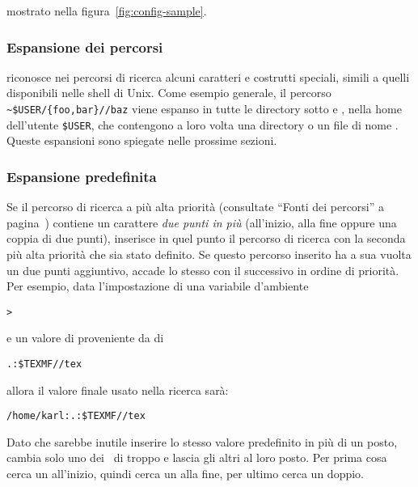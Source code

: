 \documentclass{article}
\begin{document}

\else
mostrato nella figura~\ref{fig:config-sample}.
\fi

\subsubsection{Espansione dei percorsi}
\label{sec:path-expansion}

\KPS{} riconosce nei percorsi di ricerca alcuni caratteri e costrutti
speciali, simili a quelli disponibili nelle shell di Unix. Come esempio
generale, il percorso \verb+~$USER/{foo,bar}//baz+ viene espanso
in tutte le directory sotto  e , nella home dell'utente
\texttt{\$USER}, che contengono a loro volta una directory o un file di
nome . Queste espansioni sono spiegate nelle prossime sezioni.
\subsubsection{Espansione predefinita}
\label{sec:default-expansion}

Se il percorso di ricerca a più alta priorità (consultate ``Fonti dei
percorsi'' a pagina~\pageref{sec:path-sources}) contiene un carattere \emph{due
punti in più} (all'inizio, alla fine oppure una coppia di due
punti), \KPS{} inserisce in quel punto il percorso di ricerca con la
seconda più alta priorità che sia stato definito. Se questo percorso
inserito ha a sua vuolta un due punti aggiuntivo, accade lo stesso con il
successivo in ordine di priorità. Per esempio, data l'impostazione di una
variabile d'ambiente

\begin{alltt}
> 
\end{alltt}
e un valore di  proveniente da  di

\begin{alltt}
  .:\$TEXMF//tex
\end{alltt}
allora il valore finale usato nella ricerca sarà:

\begin{alltt}
  /home/karl:.:\$TEXMF//tex
\end{alltt}

Dato che sarebbe inutile inserire lo stesso valore predefinito in più di
un posto, \KPS{} cambia solo uno dei \samp{:}\ di troppo e lascia gli
altri al loro posto. Per prima cosa cerca un \samp{:} all'inizio, quindi
cerca un \samp{:} alla fine, per ultimo cerca un \samp{:} doppio.
\end{document}
